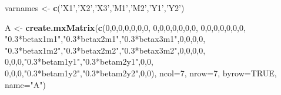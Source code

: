 \documentclass[]{article}
\newenvironment{Shaded}{\begin{snugshade}}{\end{snugshade}}
\newcommand{\KeywordTok}[1]{\textcolor[rgb]{0.13,0.29,0.53}{\textbf{#1}}}
\newcommand{\DataTypeTok}[1]{\textcolor[rgb]{0.13,0.29,0.53}{#1}}
\newcommand{\DecValTok}[1]{\textcolor[rgb]{0.00,0.00,0.81}{#1}}
\newcommand{\StringTok}[1]{\textcolor[rgb]{0.31,0.60,0.02}{#1}}
\newcommand{\OtherTok}[1]{\textcolor[rgb]{0.56,0.35,0.01}{#1}}
\newcommand{\NormalTok}[1]{#1}
\begin{document}
\begin{Shaded}
\begin{Highlighting}[]
\NormalTok{varnames <-}\StringTok{ }\KeywordTok{c}\NormalTok{(}\StringTok{'X1'}\NormalTok{,}\StringTok{'X2'}\NormalTok{,}\StringTok{'X3'}\NormalTok{,}\StringTok{'M1'}\NormalTok{,}\StringTok{'M2'}\NormalTok{,}\StringTok{'Y1'}\NormalTok{,}\StringTok{'Y2'}\NormalTok{)}

\NormalTok{A <-}\StringTok{ }\KeywordTok{create.mxMatrix}\NormalTok{(}\KeywordTok{c}\NormalTok{(}\DecValTok{0}\NormalTok{,}\DecValTok{0}\NormalTok{,}\DecValTok{0}\NormalTok{,}\DecValTok{0}\NormalTok{,}\DecValTok{0}\NormalTok{,}\DecValTok{0}\NormalTok{,}\DecValTok{0}\NormalTok{,}
                       \DecValTok{0}\NormalTok{,}\DecValTok{0}\NormalTok{,}\DecValTok{0}\NormalTok{,}\DecValTok{0}\NormalTok{,}\DecValTok{0}\NormalTok{,}\DecValTok{0}\NormalTok{,}\DecValTok{0}\NormalTok{,}
                       \DecValTok{0}\NormalTok{,}\DecValTok{0}\NormalTok{,}\DecValTok{0}\NormalTok{,}\DecValTok{0}\NormalTok{,}\DecValTok{0}\NormalTok{,}\DecValTok{0}\NormalTok{,}\DecValTok{0}\NormalTok{,}
                       \StringTok{"0.3*betax1m1"}\NormalTok{,}\StringTok{"0.3*betax2m1"}\NormalTok{,}\StringTok{"0.3*betax3m1"}\NormalTok{,}\DecValTok{0}\NormalTok{,}\DecValTok{0}\NormalTok{,}\DecValTok{0}\NormalTok{,}\DecValTok{0}\NormalTok{,}
                       \StringTok{"0.3*betax1m2"}\NormalTok{,}\StringTok{"0.3*betax2m2"}\NormalTok{,}\StringTok{"0.3*betax3m2"}\NormalTok{,}\DecValTok{0}\NormalTok{,}\DecValTok{0}\NormalTok{,}\DecValTok{0}\NormalTok{,}\DecValTok{0}\NormalTok{,}
                       \DecValTok{0}\NormalTok{,}\DecValTok{0}\NormalTok{,}\DecValTok{0}\NormalTok{,}\StringTok{"0.3*betam1y1"}\NormalTok{,}\StringTok{"0.3*betam2y1"}\NormalTok{,}\DecValTok{0}\NormalTok{,}\DecValTok{0}\NormalTok{,}
                       \DecValTok{0}\NormalTok{,}\DecValTok{0}\NormalTok{,}\DecValTok{0}\NormalTok{,}\StringTok{"0.3*betam1y2"}\NormalTok{,}\StringTok{"0.3*betam2y2"}\NormalTok{,}\DecValTok{0}\NormalTok{,}\DecValTok{0}\NormalTok{), }
                     \DataTypeTok{ncol=}\DecValTok{7}\NormalTok{, }\DataTypeTok{nrow=}\DecValTok{7}\NormalTok{, }\DataTypeTok{byrow=}\OtherTok{TRUE}\NormalTok{, }\DataTypeTok{name=}\StringTok{"A"}\NormalTok{)}


\end{Highlighting}
\end{Shaded}
\end{document}
